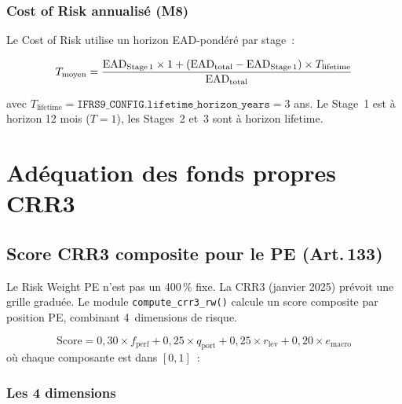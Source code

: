 \documentclass[12pt,a4paper]{article}
\begin{document}
\subsubsection{Cost of Risk annualis\'e (M8)}

Le Cost of Risk utilise un horizon EAD-pond\'er\'e par stage~:

\begin{equation}
    T_{\text{moyen}} = \frac{\text{EAD}_{\text{Stage\,1}} \times 1 + (\text{EAD}_{\text{total}} - \text{EAD}_{\text{Stage\,1}}) \times T_{\text{lifetime}}}{\text{EAD}_{\text{total}}}
    \label{eq:t_moyen}
\end{equation}

avec $T_{\text{lifetime}} = \texttt{IFRS9\_CONFIG.lifetime\_horizon\_years} = 3$ ans. Le Stage~1 est \`a horizon 12 mois ($T=1$), les Stages~2 et~3 sont \`a horizon lifetime.

\section{Ad\'equation des fonds propres CRR3}
\label{sec:crr3}

\subsection{Score CRR3 composite pour le PE (Art.\,133)}

Le Risk Weight PE n'est pas un 400\,\% fixe. La CRR3 (janvier 2025) pr\'evoit une grille gradu\'ee. Le module \texttt{compute\_crr3\_rw()} calcule un score composite par position PE, combinant 4~dimensions de risque.

\begin{formulebox}
\begin{equation}
    \text{Score} = 0{,}30 \times f_{\text{perf}} + 0{,}25 \times q_{\text{port}} + 0{,}25 \times r_{\text{lev}} + 0{,}20 \times e_{\text{macro}}
    \label{eq:crr3_score}
\end{equation}
o\`u chaque composante est dans $[0, 1]$~:
\end{formulebox}

\subsubsection{Les 4 dimensions}
\end{document}
